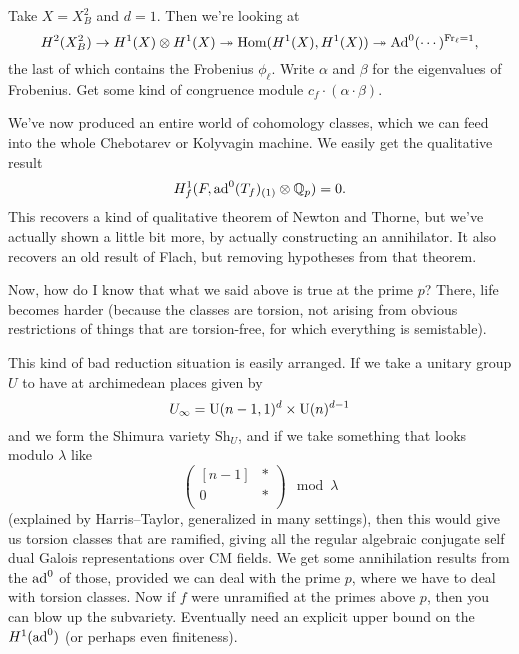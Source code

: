 \documentclass[reqno]{amsart} 
\begin{document}
Take $X = X_B^2$ and $d = 1$.  Then we're looking at
\begin{equation*}
  H^2(X_B^2) \rightarrow H^1(X) \otimes H^1(X)
  \twoheadrightarrow \operatorname{Hom}(H^1(X), H^1(X))
  \twoheadrightarrow \operatorname{Ad}^0(\dotsb)^{\mathrm{Fr}_{\ell} = 1},
\end{equation*}
the last of which contains the Frobenius $\phi_{\ell}$.  Write $\alpha$ and $\beta$ for the eigenvalues of Frobenius.  Get some kind of congruence module $c_f \cdot(\alpha \cdot \beta)$.

We've now produced an entire world of cohomology classes, which we can feed into the whole Chebotarev or Kolyvagin machine.  We easily get the qualitative result
\begin{equation*}
  H_f^1(F, \operatorname{ad}^0(T_f)_{(1)} \otimes \mathbb{Q}_p) = 0.
\end{equation*}
This recovers a kind of qualitative theorem of Newton and Thorne, but we've actually shown a little bit more, by actually constructing an annihilator.  It also recovers an old result of Flach, but removing hypotheses from that theorem.

Now, how do I know that what we said above is true at the prime $p$?  There, life becomes harder (because the classes are torsion, not arising from obvious restrictions of things that are torsion-free, for which everything is semistable).

This kind of bad reduction situation is easily arranged.  If we take a unitary group $U$ to have at archimedean places given by
\begin{equation*}
  U_\infty = \operatorname{U}(n - 1, 1)^d \times \operatorname{U}(n)^{d - 1}
\end{equation*}
and we form the Shimura variety $\mathrm{Sh}_U$, and if we take something that looks modulo $\lambda$ like
\begin{equation*}
  \begin{pmatrix}
    [n-1]    & \ast \\
    0             & \ast \\
  \end{pmatrix}
  \mod{\lambda}
\end{equation*}
(explained by Harris--Taylor, generalized in many settings), then this would give us torsion classes that are ramified, giving all the regular algebraic conjugate self dual Galois representations over CM fields.  We get some annihilation results from the $\operatorname{ad}^0$ of those, provided we can deal with the prime $p$, where we have to deal with torsion classes.  Now if $f$ were unramified at the primes above $p$, then you can blow up the subvariety.  Eventually need an explicit upper bound on the $H^1(\operatorname{ad}^0)$ (or perhaps even finiteness).
\end{document}

